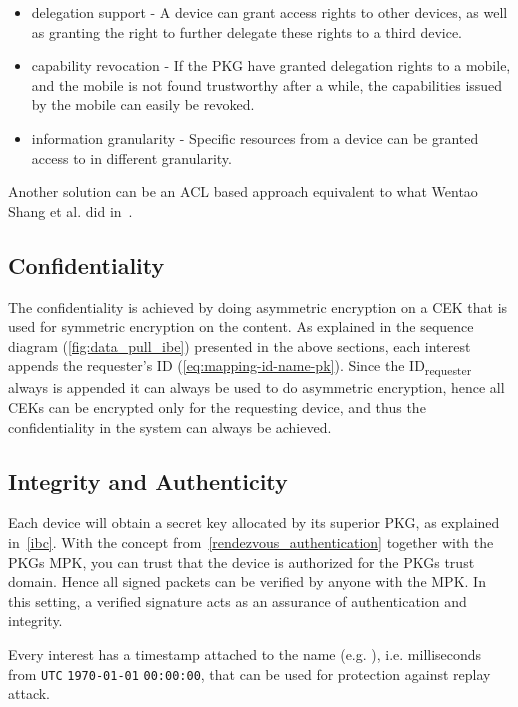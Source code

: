 \begin{itemize}
  \item delegation support - 
  A device can grant access rights to other devices, as well as granting the right to further delegate these rights to a third device.
  \item capability revocation - 
  If the \gls{PKG} have granted delegation rights to a mobile, and the mobile is not found trustworthy after a while, the capabilities issued by the mobile can easily be revoked.
  \item information granularity - 
  Specific resources from a device can be granted access to in different granularity.
\end{itemize}

Another solution can be an \gls{ACL} based approach equivalent to what Wentao Shang et al. did in~\cite{DBLP:journals/network/ShangDMBZ14}.

\subsection{Confidentiality}
The confidentiality is achieved by doing asymmetric encryption on a \gls{CEK} that is used for symmetric encryption on the content.
As explained in the sequence diagram (\autoref{fig:data_pull_ibe}) presented in the above sections, each \gls{interest} appends the requester's ID (\autoref{eq:mapping-id-name-pk}).
Since the ID\textsubscript{requester} always is appended it can always be used to do asymmetric encryption, hence all \gls{CEK}s can be encrypted only for the requesting device, and thus the confidentiality in the system can always be achieved.

\subsection{Integrity and Authenticity}
Each device will obtain a secret key allocated by its superior \gls{PKG}, as explained in~\autoref{ibc}.
With the concept from~\autoref{rendezvous_authentication} together with the \gls{PKG}s \gls{MPK}, you can trust that the device is authorized for the \gls{PKG}s trust domain. 
Hence all signed packets can be verified by anyone with the \gls{MPK}.
In this setting, a verified signature acts as an assurance of authentication and integrity. 

Every \gls{interest} has a timestamp attached to the \gls{name} (e.g. ), i.e. milliseconds from \texttt{UTC} \texttt{1970-01-01} \texttt{00:00:00}, that can be used for protection against replay attack. 

